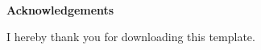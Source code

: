 \ 
\vspace{2cm}

\begin{center}
	\large \textbf{Acknowledgements}
\end{center}

\vspace{0.7cm}

I hereby thank you for downloading this template.